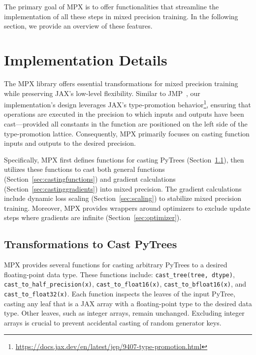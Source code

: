 \documentclass[copyright, logo]{dsme}
\newcommand{\mpx}{\textsc{MPX}}
\begin{document}
The primary goal of \mpx{} is to offer functionalities that streamline the implementation of all these steps in mixed precision training. 
In the following section, we provide an overview of these features.

\section{Implementation Details}

The \mpx{} library offers essential transformations for mixed precision training while preserving JAX's low-level flexibility. 
Similar to JMP~\citep{jmp}, our implementation's design leverages JAX's type-promotion behavior\footnote{\url{https://docs.jax.dev/en/latest/jep/9407-type-promotion.html}}, ensuring that operations are executed in the precision to which inputs and outputs have been cast—provided all constants in the function are positioned on the left side of the type-promotion lattice. 
Consequently, \mpx{} primarily focuses on casting function inputs and outputs to the desired precision.

Specifically, \mpx{} first defines functions for casting PyTrees (Section~\ref{sec:castingpytrees}), then utilizes these functions to cast both general functions (Section~\ref{sec:castingfunctions}) and gradient calculations (Section~\ref{sec:castinggradients}) into mixed precision. 
The gradient calculations include dynamic loss scaling (Section~\ref{sec:scaling}) to stabilize mixed precision training.
Moreover, \mpx{} provides wrappers around optimizers to exclude update steps where gradients are infinite (Section~\ref{sec:optimizer}).

\subsection{Transformations to Cast PyTrees}
\label{sec:castingpytrees}

\mpx{} provides several functions for casting arbitrary PyTrees to a desired floating-point data type. These functions include:
\texttt{cast\_tree(tree, dtype)}, \texttt{cast\_to\_half\_precision(x)}, \texttt{cast\_to\_float16(x)}, \texttt{cast\_to\_bfloat16(x)}, and \texttt{cast\_to\_float32(x)}. 
Each function inspects the leaves of the input PyTree, casting any leaf that is a JAX array with a floating-point type to the desired data type. 
Other leaves, such as integer arrays, remain unchanged. 
Excluding integer arrays is crucial to prevent accidental casting of random generator keys.
\end{document}
